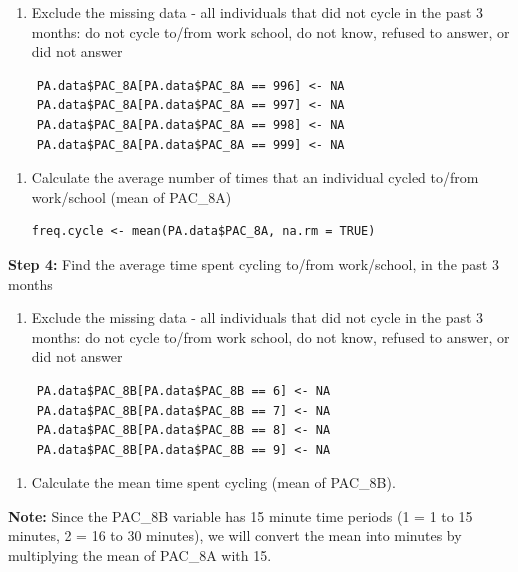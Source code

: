 \documentclass[]{book}
\providecommand{\tightlist}{%
  \setlength{\itemsep}{0pt}\setlength{\parskip}{0pt}}
\begin{document}
\begin{enumerate}
\def\labelenumi{\alph{enumi}.}
\tightlist
\item
  Exclude the missing data - all individuals that did not cycle in the
  past 3 months: do not cycle to/from work school, do not know, refused
  to answer, or did not answer
\end{enumerate}

\begin{verbatim}
    PA.data$PAC_8A[PA.data$PAC_8A == 996] <- NA
    PA.data$PAC_8A[PA.data$PAC_8A == 997] <- NA
    PA.data$PAC_8A[PA.data$PAC_8A == 998] <- NA
    PA.data$PAC_8A[PA.data$PAC_8A == 999] <- NA
\end{verbatim}

\begin{enumerate}
\def\labelenumi{\alph{enumi}.}
\setcounter{enumi}{1}
\item
  Calculate the average number of times that an individual cycled
  to/from work/school (mean of PAC\_8A)

\begin{verbatim}
freq.cycle <- mean(PA.data$PAC_8A, na.rm = TRUE)
\end{verbatim}
\end{enumerate}

\textbf{Step 4:} Find the average time spent cycling to/from
work/school, in the past 3 months

\begin{enumerate}
\def\labelenumi{\alph{enumi}.}
\tightlist
\item
  Exclude the missing data - all individuals that did not cycle in the
  past 3 months: do not cycle to/from work school, do not know, refused
  to answer, or did not answer
\end{enumerate}

\begin{verbatim}
    PA.data$PAC_8B[PA.data$PAC_8B == 6] <- NA
    PA.data$PAC_8B[PA.data$PAC_8B == 7] <- NA
    PA.data$PAC_8B[PA.data$PAC_8B == 8] <- NA
    PA.data$PAC_8B[PA.data$PAC_8B == 9] <- NA
\end{verbatim}

\begin{enumerate}
\def\labelenumi{\alph{enumi}.}
\setcounter{enumi}{1}
\tightlist
\item
  Calculate the mean time spent cycling (mean of PAC\_8B).
\end{enumerate}

\textbf{Note:} Since the PAC\_8B variable has 15 minute time periods (1
= 1 to 15 minutes, 2 = 16 to 30 minutes), we will convert the mean into
minutes by multiplying the mean of PAC\_8A with 15.
\end{document}
